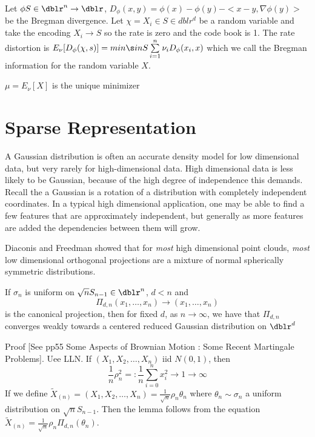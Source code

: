Let $\phi S \in \dblr^n \to \dblr$, $D_\phi (x,y) = \phi(x) - \phi(y) - < x-y, \nabla \phi(y) >$ be the Bregman divergence. Let $\chi = {X_i} \in S \in dblr^d$ be a random variable and take the encoding $X_i \to S$ so the rate is zero and the code book is 1. The rate distortion is $E_\nu [D_\phi (\chi,s)] = min \s in S \sum\limits_{i=1}^{n} \nu_i D_\phi (x_i,x)$ which we call the Bregman information for the random variable $X$.
\begin{thm}
$\mu = E_\nu [X]$ is the unique minimizer
\end{thm}


\section*{Sparse Representation}
A Gaussian distribution is often an accurate density model for low dimensional data, but very rarely for high-dimensional data. High dimensional data is less likely to be Gaussian, because of the high degree of independence this demands.  Recall the a Gaussian is a rotation of a distribution with completely independent coordinates. In a typical high dimensional application, one may be able to find a few features that are approximately independent, but generally as more features are added the dependencies between them will grow.

Diaconis and Freedman showed that for \textit{most} high dimensional point clouds, \textit{most} low dimensional orthogonal projections are a mixture of normal spherically symmetric distributions.

\begin{lem}
If $\sigma_n$ is uniform on $\sqrt{n}S_{n-1} \in \dblr^n$,  $d<n$ and
\begin{equation*}
\Pi_{d,n} ( x_1, \hdots , x_n) \rightarrow ( x_1, \hdots , x_n)
\end{equation*}
is the canonical projection, then for fixed $d$, as $ n \rightarrow \infty $, we have that
$\Pi_{d,n}$ converges weakly towards a centered reduced Gaussian distribution on $\dblr^d$
\end{lem}

Proof [See pp55 Some Aspects of Brownian Motion : Some Recent Martingale Problems].
Uee LLN.  If $(X_1,X_2, \hdots ,X_n)$ iid $N(0,1)$, then
\begin{equation*}
\frac{1}{n} \rho_{n}^{2} =: \frac{1}{n} \sum_{i=0}^{n} x_{i}^{2} \rightarrow 1  \rightarrow \infty
\end{equation*}
If we define $\tilde{X}_{(n)} = (X_1,X_2, \hdots ,X_n) = \frac{1}{\sqrt{n}} \rho_n \theta_n$ where $\theta_n \sim \sigma_n$ a uniform distribution on $\sqrt{n}S_{n-1}$.  Then the lemma follows from the equation $\tilde{X}_{(n)} = \frac{1}{\sqrt{n}} \rho_n  \Pi_{d,n} (\theta_n)$.


